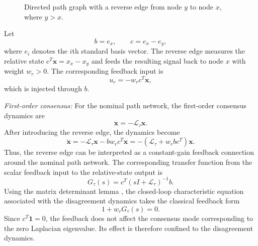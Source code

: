 \documentclass[11pt,a4paper]{article}
\begin{document}
\begin{figure}[H]
	\centering
	\caption{Directed path graph with a reverse edge from node $y$ to node $x$, where $y>x$.}
	\label{fig:directed_path_reverse_edge}
\end{figure}


Let
\[
b=e_x,\qquad c=e_x-e_y,
\]
where $e_i$ denotes the $i$th standard basis vector. The reverse edge measures the relative state $c^T\boldsymbol{x}=x_x-x_y$ and feeds the resulting signal back to node $x$ with weight $w_r>0$. The corresponding feedback input is
\[
u_r=-w_r c^T\boldsymbol{x},
\]
which is injected through $b$.

\textit{First-order consensus:}
For the nominal path network, the first-order consensus dynamics are
\[
\boldsymbol{\dot{x}}=-\mathcal{L}_{\tau}\boldsymbol{x}.
\]
After introducing the reverse edge, the dynamics become
\begin{equation}
\boldsymbol{\dot{x}}
=-\mathcal{L}_{\tau}\boldsymbol{x}-bw_rc^T\boldsymbol{x}
=-\left(\mathcal{L}_{\tau}+w_rbc^T\right)\boldsymbol{x}.
\label{eq:reverse_edge_first_order}
\end{equation}
Thus, the reverse edge can be interpreted as a constant-gain feedback connection around the nominal path network. The corresponding transfer function from the scalar feedback input to the relative-state output is
\begin{equation}
G_{\tau}(s)=c^T(sI+\mathcal{L}_{\tau})^{-1}b.
\end{equation}
Using the matrix determinant lemma \cite{harville1997}, the closed-loop characteristic equation associated with the disagreement dynamics takes the classical feedback form
\begin{equation}
1+w_rG_{\tau}(s)=0.
\label{eq:reverse_edge_feedback_first_order}
\end{equation}
Since $c^T\mathbf{1}=0$, the feedback does not affect the consensus mode corresponding to the zero Laplacian eigenvalue. Its effect is therefore confined to the disagreement dynamics.
\end{document}
